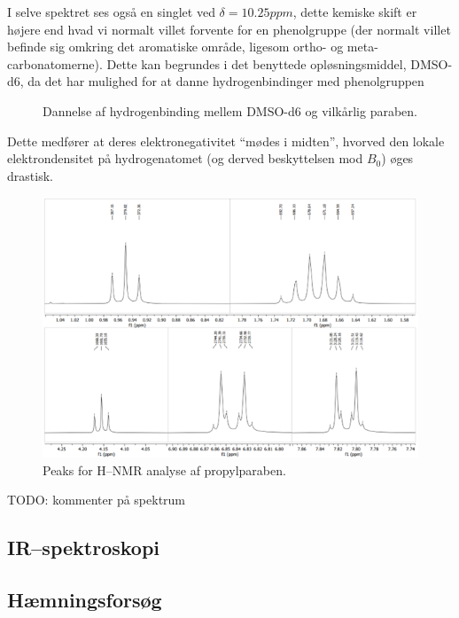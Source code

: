     I selve spektret ses også en singlet ved $\delta=10.25\si{ppm}$, dette kemiske skift er højere end hvad vi normalt villet forvente for en phenolgruppe (der normalt villet befinde sig omkring det aromatiske område, ligesom ortho- og meta-carbonatomerne). Dette kan begrundes i det benyttede opløsningsmiddel, DMSO-d6, da det har mulighed for at danne hydrogenbindinger med phenolgruppen \parencite{Raym2007}
    \begin{figure}[H]\centering
        \caption{Dannelse af hydrogenbinding mellem DMSO-d6 og vilkårlig paraben.}
    \end{figure}
    Dette medfører at deres elektronegativitet ``mødes i midten'', hvorved den lokale elektrondensitet på hydrogenatomet (og derved beskyttelsen mod $B_0$) øges drastisk.
    \begin{figure}[H] \centering
        \includegraphics[width=\textwidth]{billeder/propylpeaks}
        \caption{Peaks for H--NMR analyse af propylparaben.}
    \end{figure} 
    TODO: kommenter på spektrum

    \subsection{IR--spektroskopi}


    \subsection{Hæmningsforsøg}
    

